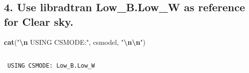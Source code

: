 \documentclass[
  10pt,
  a4paper,oneside]{article}
\newenvironment{Shaded}{\begin{snugshade}}{\end{snugshade}}
\newcommand{\FunctionTok}[1]{\textcolor[rgb]{0.13,0.29,0.53}{\textbf{#1}}}
\newcommand{\NormalTok}[1]{#1}
\newcommand{\SpecialCharTok}[1]{\textcolor[rgb]{0.81,0.36,0.00}{\textbf{#1}}}
\newcommand{\StringTok}[1]{\textcolor[rgb]{0.31,0.60,0.02}{#1}}
\begin{document}
\hypertarget{use-libradtran-low_b.low_w-as-reference-for-clear-sky.}{%
\subsection{\texorpdfstring{4. Use libradtran \textbf{Low\_B.Low\_W} as reference for Clear sky.}{4. Use libradtran Low\_B.Low\_W as reference for Clear sky.}}\label{use-libradtran-low_b.low_w-as-reference-for-clear-sky.}}

\begin{Shaded}
\begin{Highlighting}[]
\FunctionTok{cat}\NormalTok{(}\StringTok{"}\SpecialCharTok{\textbackslash{}n}\StringTok{ USING CSMODE:"}\NormalTok{, csmodel, }\StringTok{"}\SpecialCharTok{\textbackslash{}n\textbackslash{}n}\StringTok{"}\NormalTok{)}
\end{Highlighting}
\end{Shaded}

\begin{verbatim}

 USING CSMODE: Low_B.Low_W 
\end{verbatim}
\end{document}
